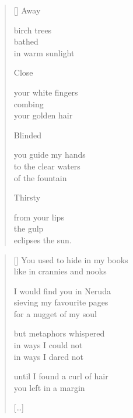\documentclass[14pt]{extbook}
\newcommand*{\centeredornament}{\centerline{\pgfornament[width=6cm]{88}}}
\begin{document}
\vspace*{-15mm}
\centeredornament
\vspace*{-7mm}


\settowidth{\versewidth}{to the clear waters}

\begin{verse}[\versewidth]
  Away

  birch trees \\
  bathed \\
  in warm sunlight

  Close

  your white fingers \\
  combing \\
  your golden hair

  Blinded

  you guide my hands \\
  to the clear waters \\
  of the fountain

  Thirsty

  from your lips \\
  the gulp \\
  eclipses the sun.
\end{verse}


\newpage

\vspace*{-15mm}
\centeredornament
\vspace*{-7mm}


\settowidth{\versewidth}{You used to hide in my books}

\begin{verse}[\versewidth]
  You used to hide in my books \\
  like in crannies and nooks

  I would find you in Neruda \\
  sieving my favourite pages \\
  for a nugget of my soul

  but metaphors whispered \\
  in ways I could not \\
  in ways I dared not

  until I found a curl of hair \\
  you left in a margin

  \hfill [\ldots]
\end{verse}
\end{document}
